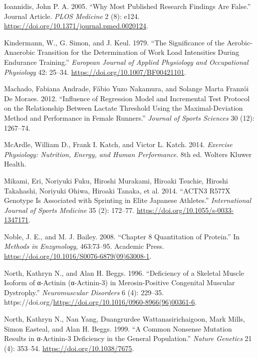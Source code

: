 \documentclass[
  letterpaper,
  DIV=11,
  numbers=noendperiod]{scrreprt}
\newlength{\cslhangindent}
\newenvironment{CSLReferences}[2] %
 {\begin{list}{}{%
  \setlength{\itemindent}{0pt}
  \setlength{\leftmargin}{0pt}
  \setlength{\parsep}{0pt}
  \ifodd #1
   \setlength{\leftmargin}{\cslhangindent}
   \setlength{\itemindent}{-1\cslhangindent}
  \fi
  \setlength{\itemsep}{#2\baselineskip}}}
 {\end{list}}
\begin{document}
\begin{CSLReferences}{1}{0}
Ioannidis, John P. A. 2005. {``Why Most Published Research Findings Are
False.''} Journal Article. \emph{PLOS Medicine} 2 (8): e124.
\url{https://doi.org/10.1371/journal.pmed.0020124}.

Kindermann, W., G. Simon, and J. Keul. 1979. {``The Significance of the
Aerobic-Anaerobic Transition for the Determination of Work Load
Intensities During Endurance Training.''} \emph{European Journal of
Applied Physiology and Occupational Physiology} 42: 25--34.
\url{https://doi.org/10.1007/BF00421101}.

Machado, Fabiana Andrade, Fábio Yuzo Nakamura, and Solange Marta Franzói
De Moraes. 2012. {``Influence of Regression Model and Incremental Test
Protocol on the Relationship Between Lactate Threshold Using the
Maximal-Deviation Method and Performance in Female Runners.''}
\emph{Journal of Sports Sciences} 30 (12): 1267--74.

McArdle, William D., Frank I. Katch, and Victor L. Katch. 2014.
\emph{Exercise Physiology: Nutrition, Energy, and Human Performance}.
8th ed. Wolters Kluwer Health.

Mikami, Eri, Noriyuki Fuku, Hiroshi Murakami, Hiroaki Tsuchie, Hiroshi
Takahashi, Noriyuki Ohiwa, Hiroaki Tanaka, et al. 2014. {``ACTN3 R577X
Genotype Is Associated with Sprinting in Elite Japanese Athletes.''}
\emph{International Journal of Sports Medicine} 35 (2): 172--77.
\url{https://doi.org/10.1055/s-0033-1347171}.

Noble, J. E., and M. J. Bailey. 2008. {``Chapter 8 Quantitation of
Protein.''} In \emph{Methods in Enzymology}, 463:73--95. Academic Press.
\url{https://doi.org/10.1016/S0076-6879(09)63008-1}.

North, Kathryn N., and Alan H. Beggs. 1996. {``Deficiency of a Skeletal
Muscle Isoform of α-Actinin (α-Actinin-3) in Merosin-Positive Congenital
Muscular Dystrophy.''} \emph{Neuromuscular Disorders} 6 (4): 229--35.
https://doi.org/\url{https://doi.org/10.1016/0960-8966(96)00361-6}.

North, Kathryn N., Nan Yang, Duangrurdee Wattanasirichaigoon, Mark
Mills, Simon Easteal, and Alan H. Beggs. 1999. {``A Common Nonsense
Mutation Results in α-Actinin-3 Deficiency in the General Population.''}
\emph{Nature Genetics} 21 (4): 353--54.
\url{https://doi.org/10.1038/7675}.


\end{CSLReferences}
\end{document}
